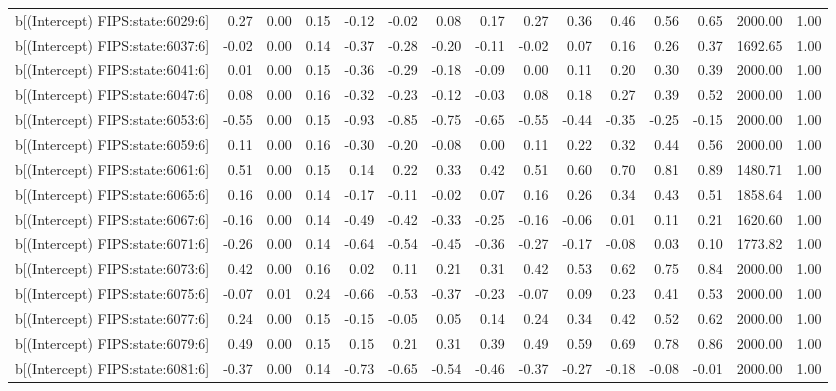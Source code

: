 \begin{table}[ht]
\begin{tabular}{rrrrrrrrrrrrrrr}
  b[(Intercept) FIPS:state:6029:6] & 0.27 & 0.00 & 0.15 & -0.12 & -0.02 & 0.08 & 0.17 & 0.27 & 0.36 & 0.46 & 0.56 & 0.65 & 2000.00 & 1.00 \\ 
  b[(Intercept) FIPS:state:6037:6] & -0.02 & 0.00 & 0.14 & -0.37 & -0.28 & -0.20 & -0.11 & -0.02 & 0.07 & 0.16 & 0.26 & 0.37 & 1692.65 & 1.00 \\ 
  b[(Intercept) FIPS:state:6041:6] & 0.01 & 0.00 & 0.15 & -0.36 & -0.29 & -0.18 & -0.09 & 0.00 & 0.11 & 0.20 & 0.30 & 0.39 & 2000.00 & 1.00 \\ 
  b[(Intercept) FIPS:state:6047:6] & 0.08 & 0.00 & 0.16 & -0.32 & -0.23 & -0.12 & -0.03 & 0.08 & 0.18 & 0.27 & 0.39 & 0.52 & 2000.00 & 1.00 \\ 
  b[(Intercept) FIPS:state:6053:6] & -0.55 & 0.00 & 0.15 & -0.93 & -0.85 & -0.75 & -0.65 & -0.55 & -0.44 & -0.35 & -0.25 & -0.15 & 2000.00 & 1.00 \\ 
  b[(Intercept) FIPS:state:6059:6] & 0.11 & 0.00 & 0.16 & -0.30 & -0.20 & -0.08 & 0.00 & 0.11 & 0.22 & 0.32 & 0.44 & 0.56 & 2000.00 & 1.00 \\ 
  b[(Intercept) FIPS:state:6061:6] & 0.51 & 0.00 & 0.15 & 0.14 & 0.22 & 0.33 & 0.42 & 0.51 & 0.60 & 0.70 & 0.81 & 0.89 & 1480.71 & 1.00 \\ 
  b[(Intercept) FIPS:state:6065:6] & 0.16 & 0.00 & 0.14 & -0.17 & -0.11 & -0.02 & 0.07 & 0.16 & 0.26 & 0.34 & 0.43 & 0.51 & 1858.64 & 1.00 \\ 
  b[(Intercept) FIPS:state:6067:6] & -0.16 & 0.00 & 0.14 & -0.49 & -0.42 & -0.33 & -0.25 & -0.16 & -0.06 & 0.01 & 0.11 & 0.21 & 1620.60 & 1.00 \\ 
  b[(Intercept) FIPS:state:6071:6] & -0.26 & 0.00 & 0.14 & -0.64 & -0.54 & -0.45 & -0.36 & -0.27 & -0.17 & -0.08 & 0.03 & 0.10 & 1773.82 & 1.00 \\ 
  b[(Intercept) FIPS:state:6073:6] & 0.42 & 0.00 & 0.16 & 0.02 & 0.11 & 0.21 & 0.31 & 0.42 & 0.53 & 0.62 & 0.75 & 0.84 & 2000.00 & 1.00 \\ 
  b[(Intercept) FIPS:state:6075:6] & -0.07 & 0.01 & 0.24 & -0.66 & -0.53 & -0.37 & -0.23 & -0.07 & 0.09 & 0.23 & 0.41 & 0.53 & 2000.00 & 1.00 \\ 
  b[(Intercept) FIPS:state:6077:6] & 0.24 & 0.00 & 0.15 & -0.15 & -0.05 & 0.05 & 0.14 & 0.24 & 0.34 & 0.42 & 0.52 & 0.62 & 2000.00 & 1.00 \\ 
  b[(Intercept) FIPS:state:6079:6] & 0.49 & 0.00 & 0.15 & 0.15 & 0.21 & 0.31 & 0.39 & 0.49 & 0.59 & 0.69 & 0.78 & 0.86 & 2000.00 & 1.00 \\ 
  b[(Intercept) FIPS:state:6081:6] & -0.37 & 0.00 & 0.14 & -0.73 & -0.65 & -0.54 & -0.46 & -0.37 & -0.27 & -0.18 & -0.08 & -0.01 & 2000.00 & 1.00 \\ 

\end{tabular}
\end{table}

